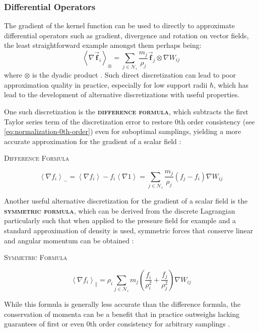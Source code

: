 \documentclass[oneside, a4paper]{book}
\newcommand\emphasis[1]{{\scshape\bfseries#1}}
\newcommand{\equationnamed}[2]{%
  \setlength{\fboxsep}{2pt} %
  \setlength{\fboxrule}{0.01pt}
  \begin{center}
    \begin{minipage}{\textwidth}
      \begin{center}\textsc{#1}\end{center}
      #2
    \end{minipage}
  \end{center}
}
\newcommand\angled[1]{\left\langle#1\right\rangle}
\newcommand\vek[1]{\vec{\bm{#1}}}
\newcommand\br[1]{\left(#1\right)}
\begin{document}
    \subsubsection{Differential Operators}
    The gradient of the kernel function can be used to directly to approximate differential operators such as gradient, divergence and rotation on vector fields, the least straightforward example amongst them perhaps being:
    \begin{equation}
      \angled{\nabla \vek{f}_i}_\otimes = \sum_{j\in\mathcal{N}_i} \frac{m_j}{\rho_j} \vek{f}_j \otimes \nabla W_{ij}
    \end{equation}
    where $\otimes$ is the dyadic product \autocite{tutorial2019}. Such direct discretization can lead to poor approximation quality in practice, especially for low support radii $\hbar$, which has lead to the development of alternative discretizations with useful properties.

    One such discretization is the \emphasis{difference formula}, which subtracts the first Taylor series term of the discretization error to restore 0th order consistency (see \autoref{eq:normalization-0th-order}) even for suboptimal samplings, yielding a more accurate approximation for the gradient of a scalar field \autocites{tutorial2019}{price-2012}:
    \equationnamed{Difference Formula}{\begin{equation}\label{eq:sph-difference}
      \angled{\nabla f_i}_- = \angled{\nabla f_i} - f_i\angled{\nabla 1} = \sum_{j\in\mathcal{N}_i} \frac{m_j}{\rho_j} \br{f_j - f_i} \nabla W_{ij}
    \end{equation}}

    Another useful alternative discretization for the gradient of a scalar field is the \emphasis{symmetric formula}, which can be derived from the discrete Lagrangian particularly such that when applied to the pressure field for example and a standard approximation of density is used, symmetric forces that conserve linear and angular momentum can be obtained \autocites{tutorial2019}{price-2012}:
    \equationnamed{Symmetric Formula}{
      \begin{equation}\label{eq:sph-symmetric}
        \angled{\nabla f_i}_\parallel = \rho_i\sum_{j\in\mathcal{N}_i} m_j \br{\frac{f_i}{\rho_i^2} + \frac{f_j}{\rho_j^2}} \nabla W_{ij}
      \end{equation}
    }
    While this formula is generally less accurate than the difference formula, the conservation of momenta can be a benefit that in practice outweighs lacking guarantees of first or even 0th order consistency for arbitrary samplings \autocite{tutorial2019}.
\end{document}
